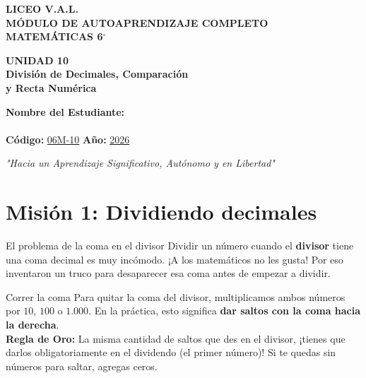 \documentclass[12pt, letterpaper]{article}
\newcommand{\titulounidad}[2]{
	\begin{tcolorbox}[colback=valblue!10, colframe=valblue, arc=3mm, boxrule=1.5pt]
		\centering \Huge \textbf{UNIDAD #1}\\[0.2cm]
		\Large \textbf{#2}
	\end{tcolorbox}
	\vspace{0.5cm}
}
\begin{document}
	
	\begin{center}
		\vspace*{1cm}
		{\Huge \textbf{LICEO V.A.L.}}\\[0.5cm]
		{\LARGE \textbf{MÓDULO DE AUTOAPRENDIZAJE COMPLETO}}\\[0.5cm]
		{\Large \textbf{MATEMÁTICAS 6$^\circ$}}\\[0.5cm]
		
		\titulounidad{10}{División de Decimales, Comparación \\ y Recta Numérica}
		
		\vspace{0.4cm}
		\begin{tcolorbox}[colback=white, colframe=valblue, width=12cm, arc=3mm, boxrule=1.5pt]
			\centering
			\vspace{0.3cm}
			\textbf{Nombre del Estudiante:}\\[0.3cm]
			\underline{\hspace{9cm}}\\[0.5cm]
			\textbf{Código:} \underline{06M-10} \hspace{1cm} \textbf{Año:} \underline{2026}
			\vspace{0.3cm}
		\end{tcolorbox}
		
		\vspace{0.8cm}
		\textit{"Hacia un Aprendizaje Significativo, Autónomo y en Libertad"}
	
	\end{center}
	
	
	\section*{Misión 1: Dividiendo decimales}
	
	\begin{concepto}{El problema de la coma en el divisor}
		Dividir un número cuando el \textbf{divisor} tiene una coma decimal es muy incómodo. ¡A los matemáticos no les gusta! Por eso inventaron un truco para desaparecer esa coma antes de empezar a dividir.
	\end{concepto}
	
	\vspace{0.2cm}
	\begin{truco}{Correr la coma}
		Para quitar la coma del divisor, multiplicamos ambos números por $10$, $100$ o $1.000$. En la práctica, esto significa \textbf{dar saltos con la coma hacia la derecha}.
		\\[0.2cm]
		\textbf{Regla de Oro:} La misma cantidad de saltos que des en el divisor, ¡tienes que darlos obligatoriamente en el dividendo (el primer número)! Si te quedas sin números para saltar, agregas ceros.
	\end{truco}
	
\end{document}
